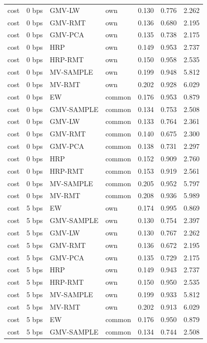 \begin{table}[t]
{\begin{tabular}{llllrrr}
cost & 0 bps & GMV-LW & own & 0.130 & 0.776 & 2.262 \\
cost & 0 bps & GMV-RMT & own & 0.136 & 0.680 & 2.195 \\
cost & 0 bps & GMV-PCA & own & 0.135 & 0.738 & 2.175 \\
cost & 0 bps & HRP & own & 0.149 & 0.953 & 2.737 \\
cost & 0 bps & HRP-RMT & own & 0.150 & 0.958 & 2.535 \\
cost & 0 bps & MV-SAMPLE & own & 0.199 & 0.948 & 5.812 \\
cost & 0 bps & MV-RMT & own & 0.202 & 0.928 & 6.029 \\
cost & 0 bps & EW & common & 0.176 & 0.953 & 0.879 \\
cost & 0 bps & GMV-SAMPLE & common & 0.134 & 0.753 & 2.508 \\
cost & 0 bps & GMV-LW & common & 0.133 & 0.764 & 2.361 \\
cost & 0 bps & GMV-RMT & common & 0.140 & 0.675 & 2.300 \\
cost & 0 bps & GMV-PCA & common & 0.138 & 0.731 & 2.297 \\
cost & 0 bps & HRP & common & 0.152 & 0.909 & 2.760 \\
cost & 0 bps & HRP-RMT & common & 0.153 & 0.919 & 2.561 \\
cost & 0 bps & MV-SAMPLE & common & 0.205 & 0.952 & 5.797 \\
cost & 0 bps & MV-RMT & common & 0.208 & 0.936 & 5.989 \\
cost & 5 bps & EW & own & 0.174 & 0.995 & 0.869 \\
cost & 5 bps & GMV-SAMPLE & own & 0.130 & 0.754 & 2.397 \\
cost & 5 bps & GMV-LW & own & 0.130 & 0.767 & 2.262 \\
cost & 5 bps & GMV-RMT & own & 0.136 & 0.672 & 2.195 \\
cost & 5 bps & GMV-PCA & own & 0.135 & 0.729 & 2.175 \\
cost & 5 bps & HRP & own & 0.149 & 0.943 & 2.737 \\
cost & 5 bps & HRP-RMT & own & 0.150 & 0.950 & 2.535 \\
cost & 5 bps & MV-SAMPLE & own & 0.199 & 0.933 & 5.812 \\
cost & 5 bps & MV-RMT & own & 0.202 & 0.913 & 6.029 \\
cost & 5 bps & EW & common & 0.176 & 0.950 & 0.879 \\
cost & 5 bps & GMV-SAMPLE & common & 0.134 & 0.744 & 2.508 \\

\end{tabular}}
\end{table}
